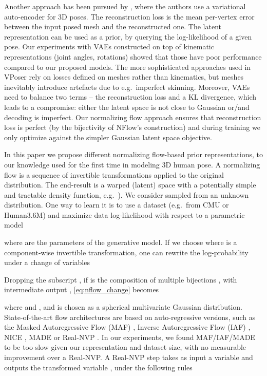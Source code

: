 \documentclass[runningheads]{llncs}
\newcommand{\eg}{e.g.\ }
\begin{document}
Another approach has been pursued by \cite{pavlakoscvpr2019}, where the authors use a variational auto-encoder for 3D poses. The reconstruction loss is the mean per-vertex error between the input posed mesh and the reconstructed one. The latent representation can be used as a prior, by querying the log-likelihood of a given pose.  Our experiments with VAEs constructed on top of kinematic representations (joint angles, rotations) showed that those have poor performance compared to our proposed models. The more sophisticated approaches used in VPoser \cite{pavlakoscvpr2019} rely on losses defined on meshes rather than kinematics, but meshes inevitably introduce artefacts due to \eg imperfect skinning.
Moreover, VAEs need to balance two terms -- the reconstruction loss and a KL divergence, which leads to a compromise: either the latent space is not close to Gaussian or/and decoding is imperfect. Our normalizing flow approach ensures that reconstruction loss is perfect (by the bijectivity of NFlow's construction) and during training we only optimize against the simpler Gaussian latent space objective. 

  In this paper we propose different normalizing flow-based prior representations, to our knowledge used for the first time in modeling 3D human pose. A normalizing flow \cite{rezende2015variational,dinh2014nice,dinh2016density,kingma2018glow} is a sequence of invertible transformations applied to the original distribution. The end-result is a warped (latent) space with a potentially simple and tractable density function, \eg ). We consider  sampled from an unknown distribution. One way to learn it is to use a dataset  (\eg from CMU or Human3.6M) and maximize data log-likelihood with respect to a parametric model 

where  are the parameters of the generative model.
If we choose  where  is a component-wise invertible transformation, one can rewrite the log-probability under a change of variables

Dropping the subscript , if  is the composition of multiple bijections , with intermediate output , \eqref{eq:nflow_change} becomes

where  and , and  is chosen as a spherical multivariate Gaussian distribution. State-of-the-art flow architectures are based on auto-regressive versions, such as the Masked Autoregressive Flow (MAF) \cite{papamakarios2017masked}, Inverse Autoregressive Flow (IAF) \cite{kingma2016improved}, NICE \cite{dinh2014nice}, MADE \cite{germain2015made} or Real-NVP \cite{dinh2016density}. In our experiments, we found MAF/IAF/MADE to be too slow given our representation and dataset size, with no measurable improvement over a Real-NVP. A Real-NVP step takes as input a variable  and outputs the transformed variable , under the following rules
\end{document}
